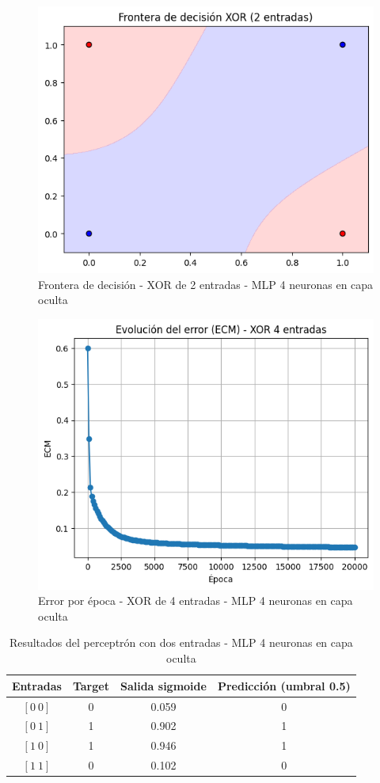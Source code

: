 \documentclass[11pt]{article} %
\begin{document}
\begin{figure}[htbp!]
	\centering
	\includegraphics[width=0.7\linewidth]{"../imgs/ej3/4 neur int/front2"}
	\caption{Frontera de decisión - XOR de 2 entradas - MLP 4 neuronas en capa oculta}
	\label{fig:front2}
\end{figure}

\begin{figure}[htbp!]
	\centering
	\includegraphics[width=0.7\linewidth]{"../imgs/ej3/4 neur int/ecm4"}
	\caption{Error por época - XOR de 4 entradas - MLP 4 neuronas en capa oculta}
	\label{fig:ecm4}
\end{figure}





\begin{table}[h!]
	\centering
	\begin{tabular}{cccc}
		\hline
		\textbf{Entradas} & \textbf{Target} & \textbf{Salida sigmoide} & \textbf{Predicción (umbral 0.5)} \\
		\hline
		$[0\ 0]$ & 0 & 0.059 & 0 \\
		$[0\ 1]$ & 1 & 0.902 & 1 \\
		$[1\ 0]$ & 1 & 0.946 & 1 \\
		$[1\ 1]$ & 0 & 0.102 & 0 \\
		\hline
	\end{tabular}
	\caption{Resultados del perceptrón con dos entradas - MLP 4 neuronas en capa oculta}
\end{table}
\end{document}
